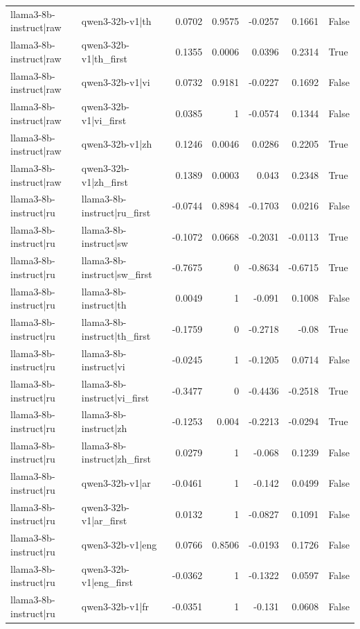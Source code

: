 \begin{table}
\begin{tabular}{l l r r r r l}
llama3-8b-instruct|raw & qwen3-32b-v1|th & 0.0702 & 0.9575 & -0.0257 & 0.1661 & False \\
llama3-8b-instruct|raw & qwen3-32b-v1|th_first & 0.1355 & 0.0006 & 0.0396 & 0.2314 & True \\
llama3-8b-instruct|raw & qwen3-32b-v1|vi & 0.0732 & 0.9181 & -0.0227 & 0.1692 & False \\
llama3-8b-instruct|raw & qwen3-32b-v1|vi_first & 0.0385 & 1 & -0.0574 & 0.1344 & False \\
llama3-8b-instruct|raw & qwen3-32b-v1|zh & 0.1246 & 0.0046 & 0.0286 & 0.2205 & True \\
llama3-8b-instruct|raw & qwen3-32b-v1|zh_first & 0.1389 & 0.0003 & 0.043 & 0.2348 & True \\
llama3-8b-instruct|ru & llama3-8b-instruct|ru_first & -0.0744 & 0.8984 & -0.1703 & 0.0216 & False \\
llama3-8b-instruct|ru & llama3-8b-instruct|sw & -0.1072 & 0.0668 & -0.2031 & -0.0113 & True \\
llama3-8b-instruct|ru & llama3-8b-instruct|sw_first & -0.7675 & 0 & -0.8634 & -0.6715 & True \\
llama3-8b-instruct|ru & llama3-8b-instruct|th & 0.0049 & 1 & -0.091 & 0.1008 & False \\
llama3-8b-instruct|ru & llama3-8b-instruct|th_first & -0.1759 & 0 & -0.2718 & -0.08 & True \\
llama3-8b-instruct|ru & llama3-8b-instruct|vi & -0.0245 & 1 & -0.1205 & 0.0714 & False \\
llama3-8b-instruct|ru & llama3-8b-instruct|vi_first & -0.3477 & 0 & -0.4436 & -0.2518 & True \\
llama3-8b-instruct|ru & llama3-8b-instruct|zh & -0.1253 & 0.004 & -0.2213 & -0.0294 & True \\
llama3-8b-instruct|ru & llama3-8b-instruct|zh_first & 0.0279 & 1 & -0.068 & 0.1239 & False \\
llama3-8b-instruct|ru & qwen3-32b-v1|ar & -0.0461 & 1 & -0.142 & 0.0499 & False \\
llama3-8b-instruct|ru & qwen3-32b-v1|ar_first & 0.0132 & 1 & -0.0827 & 0.1091 & False \\
llama3-8b-instruct|ru & qwen3-32b-v1|eng & 0.0766 & 0.8506 & -0.0193 & 0.1726 & False \\
llama3-8b-instruct|ru & qwen3-32b-v1|eng_first & -0.0362 & 1 & -0.1322 & 0.0597 & False \\
llama3-8b-instruct|ru & qwen3-32b-v1|fr & -0.0351 & 1 & -0.131 & 0.0608 & False \\

\end{tabular}
\end{table}
